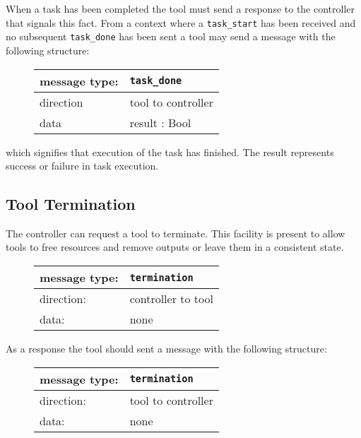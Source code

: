 \documentclass{article}
\newcommand{\msg}[1]{\texttt{#1}}
\begin{document}
   When a task has been completed the tool must send a response to the
   controller that signals this fact. From a context where a \msg{task\_start}
   has been received and no subsequent \msg{task\_done} has been sent a tool
   may send a message with the following structure:

   \begin{figure}[H]
    \begin{center}
     \begin{tabular}{|ll|}
      \hline
       message type:   & \msg{task\_done} \\
      \hline
       direction       & tool to controller \\
       data            & result : Bool \\
      \hline
     \end{tabular}
    \end{center}
   \end{figure}

   \noindent which signifies that execution of the task has finished. The
   result represents success or failure in task execution.

  \subsection{Tool Termination}

   \noindent The controller can request a tool to terminate. This facility is
   present to allow tools to free resources and remove outputs or leave
   them in a consistent state.

   \begin{figure}[H]
    \begin{center}
     \begin{tabular}{|ll|}
      \hline
       message type:    & \msg{termination} \\
      \hline
       direction:       & controller to tool \\
       data:            & none \\
      \hline
     \end{tabular}
    \end{center}
   \end{figure}

   \noindent As a response the tool should sent a message with the following
   structure:

   \begin{figure}[H]
    \begin{center}
     \begin{tabular}{|ll|}
      \hline
       message type:   & \msg{termination} \\
      \hline
       direction:      & tool to controller \\
       data:           & none \\
      \hline
     \end{tabular}
    \end{center}
   \end{figure}
\end{document}
